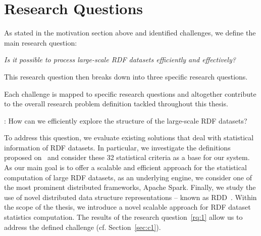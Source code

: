

\section{Research Questions}
\label{sec:research-questions}

As stated in the motivation section above and identified challenges, we define the main research question:

\begin{tcolorbox}
\centering
\textit{Is it possible to process large-scale \gls{RDF} datasets efficiently and effectively?}
\end{tcolorbox}

This research question then breaks down into three specific research questions.

Each challenge is mapped to specific research questions and altogether contribute to the overall research problem definition tackled throughout this thesis.

\begin{tcolorbox}
\textbf{\rqNr[RQ1]\label{rq:1}}: How can we efficiently explore the structure of the large-scale \gls{RDF} datasets?
\end{tcolorbox}

To address this question, we evaluate existing solutions that deal with statistical information of \gls{RDF} datasets.
In particular, we investigate the definitions proposed on~\cite{demter-2012-ekaw} and consider these 32 statistical criteria as a base for our system.
As our main goal is to offer a scalable and efficient approach for the statistical computation of large \gls{RDF} datasets, as an underlying engine, we consider one of the most prominent distributed frameworks, Apache Spark.
Finally, we study the use of novel distributed data structure representations -- known as \gls{RDD}~\cite{zaharia2012resilient}.
Within the scope of the thesis, we introduce a novel scalable approach for \gls{RDF} dataset statistics computation.
The results of the research question~\ref{rq:1} allow us to address the defined challenge (cf. Section~\ref{sec:c1}).

